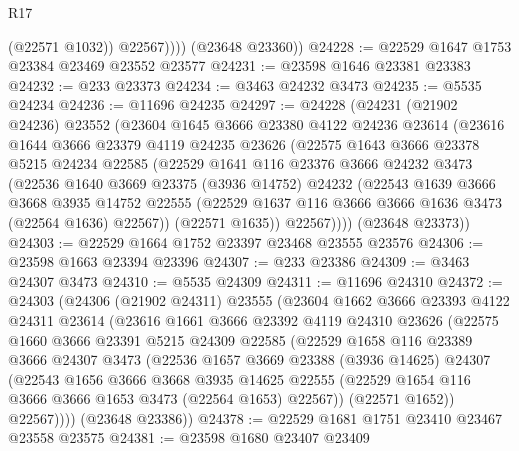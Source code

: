 \begin{lexlean}{R17}
\begin{coremodule}
                (@22571 @1032))
              @22567))))
      (@23648 @23360))
@24228 := @22529 @1647 @1753 @23384 @23469 @23552 @23577
@24231 := @23598 @1646 @23381 @23383
@24232 := @233 @23373
@24234 := @3463 @24232 @3473
@24235 := @5535 @24234
@24236 := @11696 @24235
@24297 := @24228
    (@24231
      (@21902 @24236)
      @23552
      (@23604
        @1645
        @3666
        @23380
        @4122
        @24236
        @23614
        (@23616
          @1644
          @3666
          @23379
          @4119
          @24235
          @23626
          (@22575
            @1643
            @3666
            @23378
            @5215
            @24234
            @22585
            (@22529
              @1641
              @116
              @23376
              @3666
              @24232
              @3473
              (@22536
                @1640
                @3669
                @23375
                (@3936 @14752)
                @24232
                (@22543
                  @1639
                  @3666
                  @3668
                  @3935
                  @14752
                  @22555
                  (@22529 @1637 @116 @3666 @3666 @1636 @3473 (@22564 @1636) @22567))
                (@22571 @1635))
              @22567))))
      (@23648 @23373))
@24303 := @22529 @1664 @1752 @23397 @23468 @23555 @23576
@24306 := @23598 @1663 @23394 @23396
@24307 := @233 @23386
@24309 := @3463 @24307 @3473
@24310 := @5535 @24309
@24311 := @11696 @24310
@24372 := @24303
    (@24306
      (@21902 @24311)
      @23555
      (@23604
        @1662
        @3666
        @23393
        @4122
        @24311
        @23614
        (@23616
          @1661
          @3666
          @23392
          @4119
          @24310
          @23626
          (@22575
            @1660
            @3666
            @23391
            @5215
            @24309
            @22585
            (@22529
              @1658
              @116
              @23389
              @3666
              @24307
              @3473
              (@22536
                @1657
                @3669
                @23388
                (@3936 @14625)
                @24307
                (@22543
                  @1656
                  @3666
                  @3668
                  @3935
                  @14625
                  @22555
                  (@22529 @1654 @116 @3666 @3666 @1653 @3473 (@22564 @1653) @22567))
                (@22571 @1652))
              @22567))))
      (@23648 @23386))
@24378 := @22529 @1681 @1751 @23410 @23467 @23558 @23575
@24381 := @23598 @1680 @23407 @23409

\end{coremodule}
\end{lexlean}
